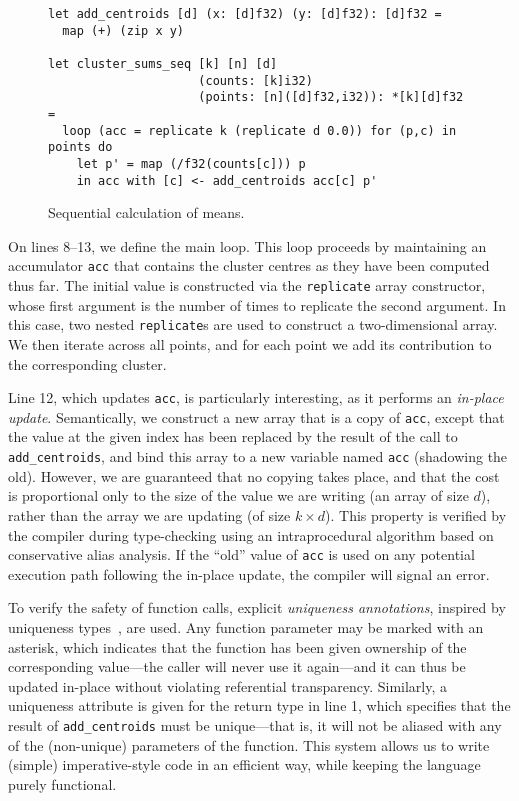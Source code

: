 \begin{figure}
\begin{lstlisting}
let add_centroids [d] (x: [d]f32) (y: [d]f32): [d]f32 =
  map (+) (zip x y)

let cluster_sums_seq [k] [n] [d]
                     (counts: [k]i32)
                     (points: [n]([d]f32,i32)): *[k][d]f32 =
  loop (acc = replicate k (replicate d 0.0)) for (p,c) in points do
    let p' = map (/f32(counts[c])) p
    in acc with [c] <- add_centroids acc[c] p'
\end{lstlisting}
\caption{Sequential calculation of means.}
\label{fig:sequential-means}
\end{figure}

On lines 8--13, we define the main loop.  This loop proceeds by
maintaining an accumulator \texttt{acc} that contains the cluster
centres as they have been computed thus far.  The initial value is
constructed via the \texttt{replicate} array constructor, whose first
argument is the number of times to replicate the second argument.  In
this case, two nested \texttt{replicate}s are used to construct a
two-dimensional array.  We then iterate across all points, and for
each point we add its contribution to the corresponding cluster.

Line 12, which updates \texttt{acc}, is particularly interesting, as
it performs an \textit{in-place update}.  Semantically, we construct a
new array that is a copy of \texttt{acc}, except that the value at the
given index has been replaced by the result of the call to
\texttt{add\_centroids}, and bind this array to a new variable named
\texttt{acc} (shadowing the old).  However, we are guaranteed that no
copying takes place, and that the cost is proportional only to the
size of the value we are writing (an array of size $d$), rather than
the array we are updating (of size $k\times{}d$).  This property is
verified by the compiler during type-checking using an intraprocedural
algorithm based on conservative alias analysis.  If the ``old'' value
of \texttt{acc} is used on any potential execution path following the
in-place update, the compiler will signal an error.

To verify the safety of function calls, explicit \textit{uniqueness
  annotations}, inspired by uniqueness
types~\cite{clean-uniqueness-types,barendsen1996uniqueness}, are used.
Any function parameter may be marked with an asterisk, which indicates
that the function has been given ownership of the corresponding
value---the caller will never use it again---and it can thus be
updated in-place without violating referential transparency.
Similarly, a uniqueness attribute is given for the return type in line
1, which specifies that the result of \texttt{add\_centroids} must be
unique---that is, it will not be aliased with any of the (non-unique)
parameters of the function.  This system allows us to write (simple)
imperative-style code in an efficient way, while keeping the language
purely functional.

